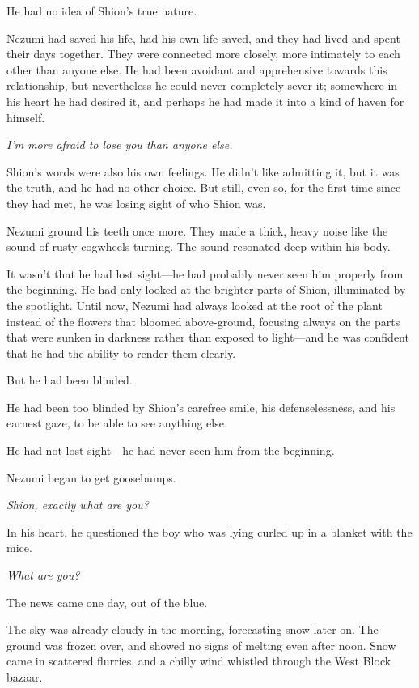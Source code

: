 He had no idea of Shion's true nature.

Nezumi had saved his life, had his own life saved, and they had lived
and spent their days together. They were connected more closely, more
intimately to each other than anyone else. He had been avoidant and
apprehensive towards this relationship, but nevertheless he could never
completely sever it; somewhere in his heart he had desired it, and
perhaps he had made it into a kind of haven for himself.

\emph{I'm more afraid to lose you than anyone else.}

Shion's words were also his own feelings. He didn't like admitting it,
but it was the truth, and he had no other choice. But still, even so,
for the first time since they had met, he was losing sight of who Shion
was.

Nezumi ground his teeth once more. They made a thick, heavy noise like
the sound of rusty cogwheels turning. The sound resonated deep within
his body.

It wasn't that he had lost sight---he had probably never seen him properly
from the beginning. He had only looked at the brighter parts of Shion,
illuminated by the spotlight. Until now, Nezumi had always looked at the
root of the plant instead of the flowers that bloomed above-ground,
focusing always on the parts that were sunken in darkness rather than
exposed to light---and he was confident that he had the ability to render
them clearly.

But he had been blinded.

He had been too blinded by Shion's carefree smile, his defenselessness,
and his earnest gaze, to be able to see anything else.

He had not lost sight---he had never seen him from the beginning.

Nezumi began to get goosebumps.

\emph{Shion, exactly what are you?}

In his heart, he questioned the boy who was lying curled up in a blanket
with the mice.

\emph{What are you?}

\myspace

The news came one day, out of the blue.

The sky was already cloudy in the morning, forecasting snow later on.
The ground was frozen over, and showed no signs of melting even after
noon. Snow came in scattered flurries, and a chilly wind whistled
through the West Block bazaar.

